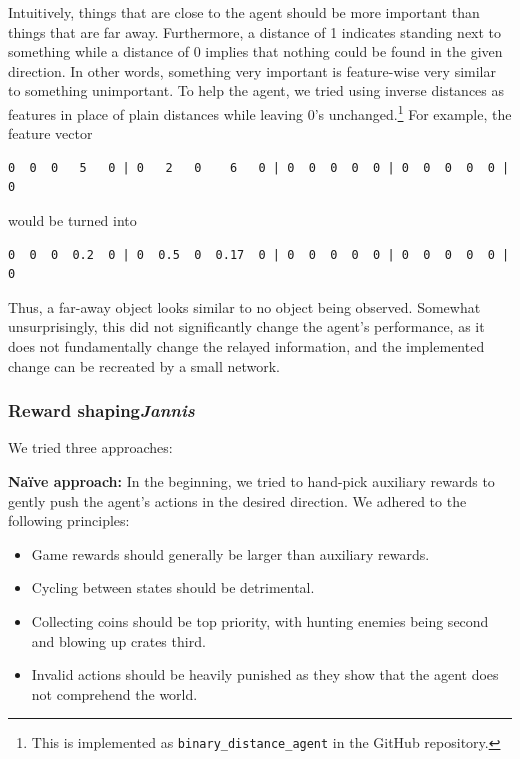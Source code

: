 \documentclass{article}
\begin{document}
Intuitively, things that are close to the agent should be more important than things that are far away. Furthermore, a distance of 1 indicates standing next to something while a distance of 0 implies that nothing could be found in the given direction. In other words, something very important is feature-wise very similar to something unimportant. To help the agent, we tried using inverse distances as features in place of plain distances while leaving 0's unchanged.\footnote{This is implemented as \texttt{binary\_distance\_agent} in the GitHub repository.} For example, the feature vector

\begin{verbatim}
0  0  0   5   0 | 0   2   0    6   0 | 0  0  0  0  0 | 0  0  0  0  0 | 0
\end{verbatim}

would be turned into

\begin{verbatim}
0  0  0  0.2  0 | 0  0.5  0  0.17  0 | 0  0  0  0  0 | 0  0  0  0  0 | 0
\end{verbatim}

Thus, a far-away object looks similar to no object being observed. Somewhat unsurprisingly, this did not significantly change the agent's performance, as it does not fundamentally change the relayed information, and the implemented change can be recreated by a small network.

\subsubsection[Reward shaping]{Reward shaping{\normalsize \normalfont \it \hfill Jannis}}

We tried three approaches:

\textbf{Naïve approach:} In the beginning, we tried to hand-pick auxiliary rewards to gently push the agent's actions in the desired direction. We adhered to the following principles:

\begin{itemize}
    \item Game rewards should generally be larger than auxiliary rewards.
    \item Cycling between states should be detrimental.
    \item Collecting coins should be top priority, with hunting enemies being second and blowing up crates third.
    \item Invalid actions should be heavily punished as they show that the agent does not comprehend the world.
    
\end{itemize}
\end{document}
